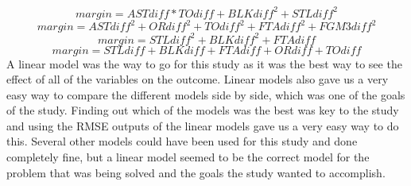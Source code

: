 \documentclass{article}
\begin{document}
\begin{equation}
    margin = ASTdiff*TOdiff + BLKdiff^2 + STLdiff^2
\end{equation}
\begin{equation}
    margin = ASTdiff^2 + ORdiff^2 + TOdiff^2 + FTAdiff^2 + FGM3diff^2
\end{equation}
\begin{equation}
    margin = STLdiff^2 + BLKdiff^2 + FTAdiff
\end{equation}
\begin{equation}
    margin = STLdiff + BLKdiff + FTAdiff + ORdiff + TOdiff
\end{equation} 
\indent A linear model was the way to go for this study as it was the best way to see the effect of all of the variables on the outcome. Linear models also gave us a very easy way to compare the different models side by side, which was one of the goals of the study. Finding out which of the models was the best was key to the study and using the RMSE outputs of the linear models gave us a very easy way to do this. Several other models could have been used for this study and done completely fine, but a linear model seemed to be the correct model for the problem that was being solved and the goals the study wanted to accomplish.
\end{document}

